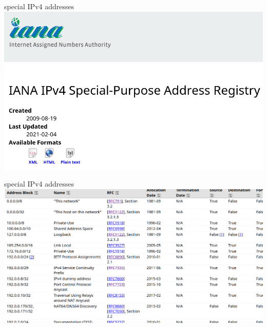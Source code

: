 \begin{frame}{special IPv4 addresses}
\includegraphics[width=\textwidth]{../arp/iana-special-ipv4-header}
\end{frame}

\begin{frame}{special IPv4 addresses}
\includegraphics[width=\textwidth]{../arp/iana-special-ipv4-detail}
\end{frame}

